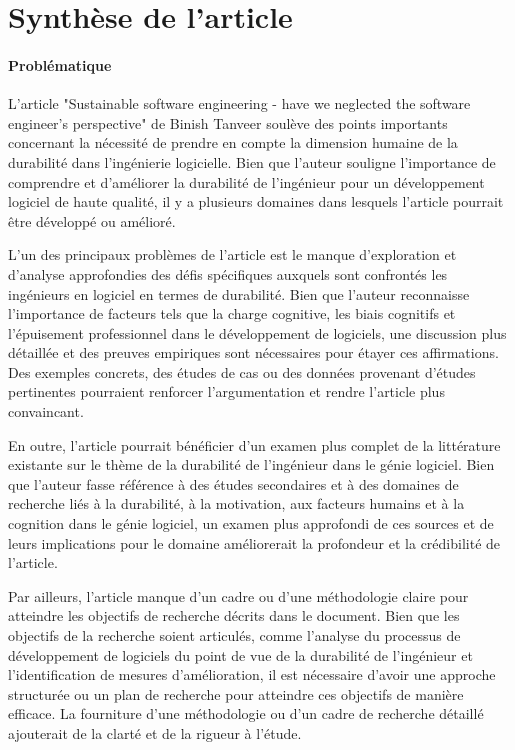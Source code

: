 \section{Synthèse de l'article}

\paragraph{Problématique}
L'article "Sustainable software engineering - have we neglected the software engineer's perspective" de Binish Tanveer soulève des points importants concernant la nécessité de prendre en compte la dimension humaine de la durabilité dans l'ingénierie logicielle. Bien que l'auteur souligne l'importance de comprendre et d'améliorer la durabilité de l'ingénieur pour un développement logiciel de haute qualité, il y a plusieurs domaines dans lesquels l'article pourrait être développé ou amélioré.

L'un des principaux problèmes de l'article est le manque d'exploration et d'analyse approfondies des défis spécifiques auxquels sont confrontés les ingénieurs en logiciel en termes de durabilité. Bien que l'auteur reconnaisse l'importance de facteurs tels que la charge cognitive, les biais cognitifs et l'épuisement professionnel dans le développement de logiciels, une discussion plus détaillée et des preuves empiriques sont nécessaires pour étayer ces affirmations. Des exemples concrets, des études de cas ou des données provenant d'études pertinentes pourraient renforcer l'argumentation et rendre l'article plus convaincant.

En outre, l'article pourrait bénéficier d'un examen plus complet de la littérature existante sur le thème de la durabilité de l'ingénieur dans le génie logiciel. Bien que l'auteur fasse référence à des études secondaires et à des domaines de recherche liés à la durabilité, à la motivation, aux facteurs humains et à la cognition dans le génie logiciel, un examen plus approfondi de ces sources et de leurs implications pour le domaine améliorerait la profondeur et la crédibilité de l'article.

Par ailleurs, l'article manque d'un cadre ou d'une méthodologie claire pour atteindre les objectifs de recherche décrits dans le document. Bien que les objectifs de la recherche soient articulés, comme l'analyse du processus de développement de logiciels du point de vue de la durabilité de l'ingénieur et l'identification de mesures d'amélioration, il est nécessaire d'avoir une approche structurée ou un plan de recherche pour atteindre ces objectifs de manière efficace. La fourniture d'une méthodologie ou d'un cadre de recherche détaillé ajouterait de la clarté et de la rigueur à l'étude.

